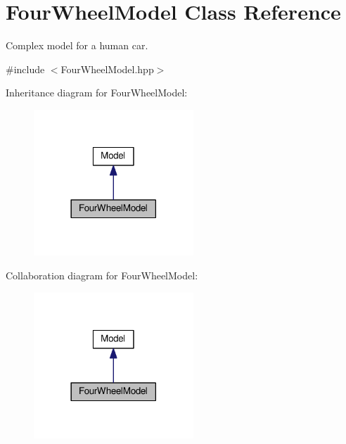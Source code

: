 \hypertarget{classFourWheelModel}{}\section{Four\+Wheel\+Model Class Reference}
\label{classFourWheelModel}


Complex model for a human car.  




{\ttfamily \#include $<$Four\+Wheel\+Model.\+hpp$>$}



Inheritance diagram for Four\+Wheel\+Model\+:\nopagebreak
\begin{figure}[H]
\begin{center}
\leavevmode
\includegraphics[width=170pt]{classFourWheelModel__inherit__graph}
\end{center}
\end{figure}


Collaboration diagram for Four\+Wheel\+Model\+:\nopagebreak
\begin{figure}[H]
\begin{center}
\leavevmode
\includegraphics[width=170pt]{classFourWheelModel__coll__graph}
\end{center}
\end{figure}
